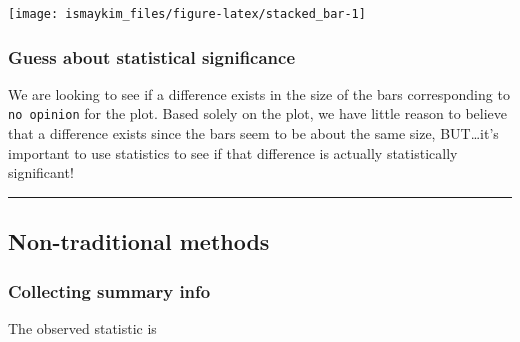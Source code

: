 \documentclass[12pt, krantz2,]{krantz}
\makeatletter
\newenvironment{Shaded}{\begin{snugshade}}{\end{snugshade}}
\newcommand{\DataTypeTok}[1]{\textcolor[rgb]{0.27,0.27,0.27}{#1}}
\newcommand{\KeywordTok}[1]{\textcolor[rgb]{0.27,0.27,0.27}{\textbf{#1}}}
\newcommand{\NormalTok}[1]{#1}
\newcommand{\OperatorTok}[1]{\textcolor[rgb]{0.43,0.43,0.43}{\textbf{#1}}}
\newcommand{\StringTok}[1]{\textcolor[rgb]{0.5,0.5,0.5}{#1}}
\newenvironment{kframe}{%
\medskip{}
\setlength{\fboxsep}{.8em}
 \def\at@end@of@kframe{}%
 \ifinner\ifhmode%
  \def\at@end@of@kframe{\end{minipage}}%
  \begin{minipage}{\columnwidth}%
 \fi\fi%
 \def\FrameCommand##1{\hskip\@totalleftmargin \hskip-\fboxsep
 \colorbox{shadecolor}{##1}\hskip-\fboxsep
     \hskip-\linewidth \hskip-\@totalleftmargin \hskip\columnwidth}%
 \MakeFramed {\advance\hsize-\width
   \@totalleftmargin\z@ \linewidth\hsize
   \@setminipage}}%
 {\par\unskip\endMakeFramed%
 \at@end@of@kframe}
\renewenvironment{Shaded}{\begin{kframe}}{\end{kframe}}
\makeatother
\begin{document}
\begin{center}\texttt{[image: ismaykim\_files/figure-latex/stacked\_bar-1]} \end{center}

\hypertarget{guess-about-statistical-significance-2}{%
\subsubsection*{Guess about statistical significance}\label{guess-about-statistical-significance-2}}


We are looking to see if a difference exists in the size of the bars corresponding to \texttt{no\ opinion} for the plot. Based solely on the plot, we have little reason to believe that a difference exists since the bars seem to be about the same size, BUT\ldots{}it's important to use statistics to see if that difference is actually statistically significant!

\begin{center}\rule{0.5\linewidth}{\linethickness}\end{center}

\hypertarget{non-traditional-methods-2}{%
\subsection{Non-traditional methods}\label{non-traditional-methods-2}}

\hypertarget{collecting-summary-info}{%
\subsubsection*{Collecting summary info}\label{collecting-summary-info}}


The observed statistic is

\begin{Shaded}
\end{Shaded}
\end{document}
